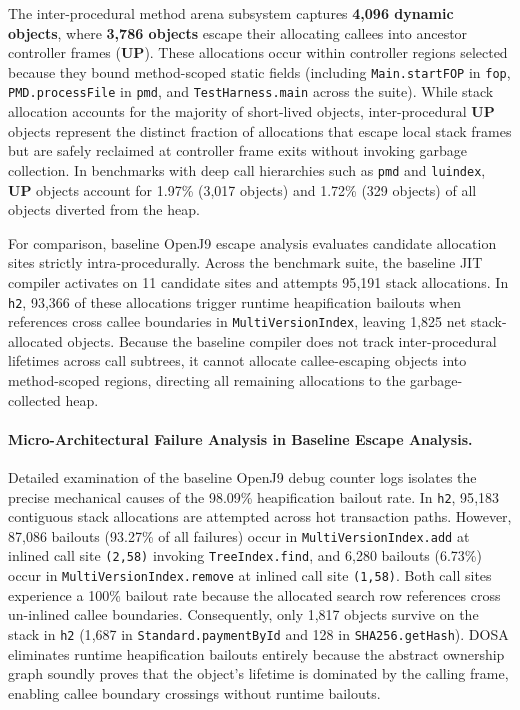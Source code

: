 \documentclass[12pt,a4paper]{article}
\newcommand{\UP}{\textbf{UP}}
\begin{document}
The inter-procedural method arena subsystem captures \textbf{4{,}096 dynamic objects}, where \textbf{3{,}786 objects} escape their allocating callees into ancestor controller frames (\UP{}). These allocations occur within controller regions selected because they bound method-scoped static fields (including \texttt{Main.startFOP} in \texttt{fop}, \texttt{PMD.processFile} in \texttt{pmd}, and \texttt{TestHarness.main} across the suite). While stack allocation accounts for the majority of short-lived objects, inter-procedural \UP{} objects represent the distinct fraction of allocations that escape local stack frames but are safely reclaimed at controller frame exits without invoking garbage collection. In benchmarks with deep call hierarchies such as \texttt{pmd} and \texttt{luindex}, \UP{} objects account for 1.97\% (3{,}017 objects) and 1.72\% (329 objects) of all objects diverted from the heap.

For comparison, baseline OpenJ9 escape analysis evaluates candidate allocation sites strictly intra-procedurally. Across the benchmark suite, the baseline JIT compiler activates on 11 candidate sites and attempts 95{,}191 stack allocations. In \texttt{h2}, 93{,}366 of these allocations trigger runtime heapification bailouts when references cross callee boundaries in \texttt{Multi}\allowbreak\texttt{Version}\allowbreak\texttt{Index}, leaving 1{,}825 net stack-allocated objects. Because the baseline compiler does not track inter-procedural lifetimes across call subtrees, it cannot allocate callee-escaping objects into method-scoped regions, directing all remaining allocations to the garbage-collected heap.

\paragraph{Micro-Architectural Failure Analysis in Baseline Escape Analysis.}
Detailed examination of the baseline OpenJ9 debug counter logs isolates the precise mechanical causes of the 98.09\% heapification bailout rate. In \texttt{h2}, 95{,}183 contiguous stack allocations are attempted across hot transaction paths. However, 87{,}086 bailouts (93.27\% of all failures) occur in \texttt{Multi}\allowbreak\texttt{Version}\allowbreak\texttt{Index.add} at inlined call site \texttt{(2,58)} invoking \texttt{TreeIndex.find}, and 6{,}280 bailouts (6.73\%) occur in \texttt{Multi}\allowbreak\texttt{Version}\allowbreak\texttt{Index.remove} at inlined call site \texttt{(1,58)}. Both call sites experience a 100\% bailout rate because the allocated search row references cross un-inlined callee boundaries. Consequently, only 1{,}817 objects survive on the stack in \texttt{h2} (1{,}687 in \texttt{Standard.paymentById} and 128 in \texttt{SHA256.getHash}). DOSA eliminates runtime heapification bailouts entirely because the abstract ownership graph soundly proves that the object's lifetime is dominated by the calling frame, enabling callee boundary crossings without runtime bailouts.
\end{document}
